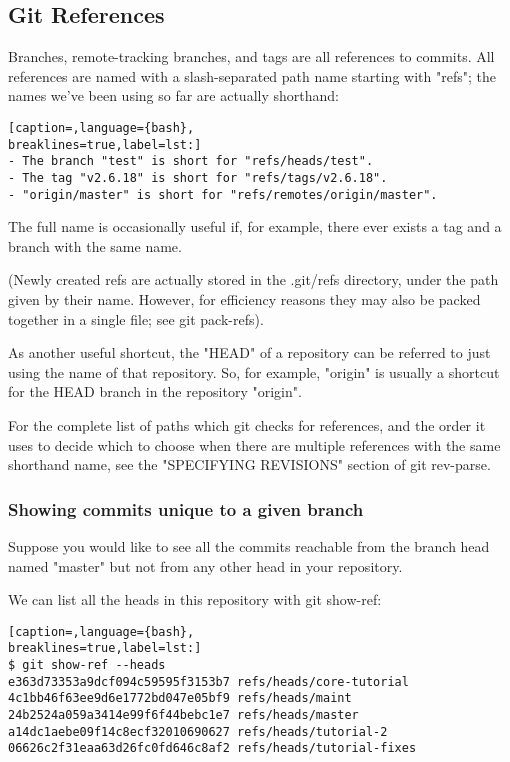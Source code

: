 \subsection{Git References}
Branches, remote-tracking branches, and tags are all references to commits. All
references are named with a slash-separated path name starting with "refs"; the
names we've been using so far are actually shorthand:
\lstset{basicstyle=\scriptsize, numbers=none, captionpos=b, tabsize=4}
\begin{lstlisting}[caption=,language={bash},
breaklines=true,label=lst:]
- The branch "test" is short for "refs/heads/test".
- The tag "v2.6.18" is short for "refs/tags/v2.6.18".
- "origin/master" is short for "refs/remotes/origin/master".
\end{lstlisting}

The full name is occasionally useful if, for example, there ever exists a tag
and a branch with the same name.

(Newly created refs are actually stored in the .git/refs directory, under the
path given by their name. However, for efficiency reasons they may also be
packed together in a single file; see git pack-refs).

As another useful shortcut, the "HEAD" of a repository can be referred to just
using the name of that repository. So, for example, "origin" is usually a
shortcut for the HEAD branch in the repository "origin".

For the complete list of paths which git checks for references, and the order
it uses to decide which to choose when there are multiple references with the
same shorthand name, see the "SPECIFYING REVISIONS" section of git rev-parse.

\subsubsection{Showing commits unique to a given branch}
Suppose you would like to see all the commits reachable from the branch head
named "master" but not from any other head in your repository.

We can list all the heads in this repository with git show-ref:
\lstset{basicstyle=\scriptsize, numbers=none, captionpos=b, tabsize=4}
\begin{lstlisting}[caption=,language={bash},
breaklines=true,label=lst:]
$ git show-ref --heads
e363d73353a9dcf094c59595f3153b7 refs/heads/core-tutorial
4c1bb46f63ee9d6e1772bd047e05bf9 refs/heads/maint
24b2524a059a3414e99f6f44bebc1e7 refs/heads/master
a14dc1aebe09f14c8ecf32010690627 refs/heads/tutorial-2
06626c2f31eaa63d26fc0fd646c8af2 refs/heads/tutorial-fixes
\end{lstlisting}


